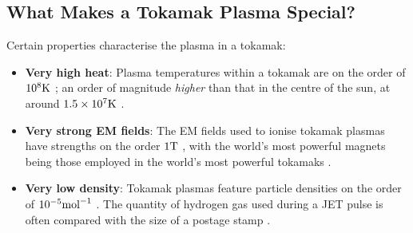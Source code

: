     \subsection{What Makes a Tokamak Plasma Special?}
        Certain properties characterise the plasma in a tokamak:
        \begin{itemize}
            \item  {\bf Very high heat}: Plasma temperatures within a tokamak are on the order of $10^{8}\mathrm{K}$ \BA{[Ref]}; an order of magnitude \emph{higher} than that in the centre of the sun, at around $1.5\times10^{7}\mathrm{K}$ \BA{[Ref]}.
            \item  {\bf Very strong EM fields}: The EM fields used to ionise tokamak plasmas have strengths on the order $1\mathrm{T}$ \BA{[Ref]}, with the world's most powerful magnets being those employed in the world's most powerful tokamaks \BA{[Ref]}.
            \item  {\bf Very low density}:  Tokamak plasmas feature particle densities on the order of $10^{- 5}{\rm mol}^{- 1}$   \BA{[Ref]}. The quantity of hydrogen gas used during a JET pulse is often compared with the size  of a postage stamp \BA{[Ref]}.
        \end{itemize}
        
